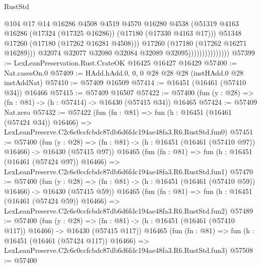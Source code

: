 \begin{lexlean}{RustStd}
\begin{coremodule}
                                      @104
                                      @17
                                      @14
                                      @16286
                                      @4508
                                      @4519
                                      @4570
                                      @16280
                                      @4538
                                      (@51319
                                        @4163
                                        @16286
                                        (@17324 (@17325 @16286))
                                        (@17180 (@17330 @4163 @17)))
                                      @51348
                                      @17260
                                      (@17180 (@17262 @16281 @4508)))
                                    @17260
                                    (@17180 (@17262 @16271 @16289)))
                                  @32074
                                  @32077
                                  @32080
                                  @32084
                                  @32089
                                  @32095)))))))))))))))
@57399 := LexLeanPreservation.Rust.CrateOK @16425 @16427 @16429
@57400 := Nat.casesOn.{0}
@57409 := HAdd.hAdd.{0, 0, 0} @28 @28 @28 (instHAdd.{0} @28 instAddNat)
@57410 := @57409 @16509
@57414 := @16451 (@16461 (@57410 @34)) @16466
@57415 := @57409 @16507
@57422 := @57400 (fun (y : @28) => (fn : @81) -> (h : @57414) -> @16430 (@57415 @34)) @16465
@57424 := @57409 Nat.zero
@57432 := @57422
    (fun (fn : @81) =>
    fun (h : @16451 (@16461 (@57424 @34)) @16466) =>
    LexLeanPreserve.C2c6c0ccfcbdc87db6d6fdc194ae48fa3.R6.RustStd.fun0)
@57451 := @57400
    (fun (y : @28) =>
    (fn : @81) -> (h : @16451 (@16461 (@57410 @97)) @16466) -> @16430 (@57415 @97))
    @16465
    (fun (fn : @81) =>
    fun (h : @16451 (@16461 (@57424 @97)) @16466) =>
    LexLeanPreserve.C2c6c0ccfcbdc87db6d6fdc194ae48fa3.R6.RustStd.fun1)
@57470 := @57400
    (fun (y : @28) =>
    (fn : @81) -> (h : @16451 (@16461 (@57410 @59)) @16466) -> @16430 (@57415 @59))
    @16465
    (fun (fn : @81) =>
    fun (h : @16451 (@16461 (@57424 @59)) @16466) =>
    LexLeanPreserve.C2c6c0ccfcbdc87db6d6fdc194ae48fa3.R6.RustStd.fun2)
@57489 := @57400
    (fun (y : @28) =>
    (fn : @81) -> (h : @16451 (@16461 (@57410 @117)) @16466) -> @16430 (@57415 @117))
    @16465
    (fun (fn : @81) =>
    fun (h : @16451 (@16461 (@57424 @117)) @16466) =>
    LexLeanPreserve.C2c6c0ccfcbdc87db6d6fdc194ae48fa3.R6.RustStd.fun3)
@57508 := @57400

\end{coremodule}
\end{lexlean}
